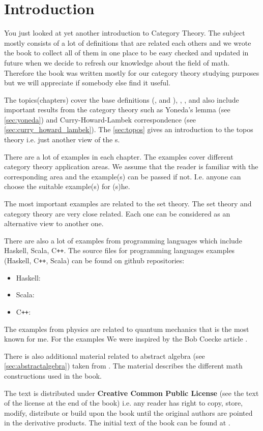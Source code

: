 \chapter*{Introduction}

You just looked at yet another introduction to Category Theory. The
subject mostly consists of a lot of definitions that are related each
others and we wrote the book to collect all of them in one
place to be easy checked and updated in future when we decide to refresh
our knowledge about the field of math. Therefore the book was written mostly
for our category theory studying purposes but we will appreciate if
somebody else find it useful. 

The topics(chapters) cover the base definitions
(,  and
), ,
,  and also include important
results from the category theory such as Yoneda's lemma (see
\cref{sec:yoneda}) and Curry-Howard-Lambek correspondence (see
\cref{sec:curry_howard_lambek}). The \cref{sec:topos} gives an
introduction to the topos theory i.e. just another view of the
s.

There are a lot of examples in each chapter. The examples cover
different category 
theory application areas. We assume that the reader is familiar with
the corresponding area and the example(s) can be passed if not. I.e.
anyone can choose the suitable example(s) for (s)he. 

The most important examples are related to the set theory. The set
theory and category theory are very close related. Each one can be
considered as an alternative view to another one.

There are also a lot of examples from programming languages which include
Haskell, Scala, C\texttt{++}. The source files for programming languages 
examples (Haskell, C\texttt{++}, Scala) can be found on github repositories:
\begin{itemize}
\item Haskell: \cite{github:cattheory_hs_examples}
\item Scala: \cite{github:cattheory_scala_examples}
\item C\texttt{++}: \cite{github:cattheory_cpp_examples}
\end{itemize}

The examples from physics are related to quantum mechanics that is the
most known for me. For the examples We were inspired by the Bob Coecke
article \cite{bib:arxiv:Bob_Coecke_2008}.

There is also additional material related to abstract algebra (see
\cref{sec:abstractalgebra}) taken from
\cite{github:galois_ivanmurashko}. The material describes the
different math constructions used in the book.

The text is distributed under \textbf{Creative Common Public License}
(see the text of the license at the end of the book)
i.e. any reader has right to copy, store, modify, distribute or build
upon the book until the original authors are pointed in the derivative
products. The initial text of the book can be found at
\cite{github:cattheory_ivanmurashko}.  
